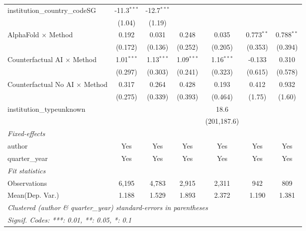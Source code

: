\begin{tabular}{lcccccc}
   institution\_country\_codeSG          & -11.3$^{***}$ & -12.7$^{***}$ &               &               &               &   \\   
                                         & (1.04)        & (1.19)        &               &               &               &   \\   
   AlphaFold $\times$ Method             & 0.192         & 0.031         & 0.248         & 0.035         & 0.773$^{**}$  & 0.788$^{**}$\\   
                                         & (0.172)       & (0.136)       & (0.252)       & (0.205)       & (0.353)       & (0.394)\\   
   Counterfactual AI $\times$ Method     & 1.01$^{***}$  & 1.13$^{***}$  & 1.09$^{***}$  & 1.16$^{***}$  & -0.133        & 0.310\\   
                                         & (0.297)       & (0.303)       & (0.241)       & (0.323)       & (0.615)       & (0.578)\\   
   Counterfactual No AI $\times$ Method  & 0.317         & 0.264         & 0.428         & 0.193         & 0.412         & 0.932\\   
                                         & (0.275)       & (0.339)       & (0.393)       & (0.464)       & (1.75)        & (1.60)\\   
   institution\_typeunknown              &               &               &               & 18.6          &               &   \\   
                                         &               &               &               & (201,187.6)   &               &   \\   
   \midrule
   \emph{Fixed-effects}\\
   author                                & Yes           & Yes           & Yes           & Yes           & Yes           & Yes\\  
   quarter\_year                         & Yes           & Yes           & Yes           & Yes           & Yes           & Yes\\  
   \midrule
   \emph{Fit statistics}\\
   Observations                          & 6,195         & 4,783         & 2,915         & 2,311         & 942           & 809\\  
Mean(Dep. Var.) & 1.188 & 1.529 & 1.893 & 2.372 & 1.190 & 1.381 \\
   \midrule \midrule
   \multicolumn{7}{l}{\emph{Clustered (author \& quarter\_year) standard-errors in parentheses}}\\
   \multicolumn{7}{l}{\emph{Signif. Codes: ***: 0.01, **: 0.05, *: 0.1}}\\
\end{tabular}
\par\endgroup
